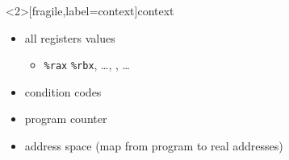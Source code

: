 
\begin{frame}<2>[fragile,label=context]{context}
\begin{itemize}
\item all registers values
    \begin{itemize}
        \item \lstinline|%rax| \lstinline|%rbx|, \ldots, , \ldots
    \end{itemize}
\item condition codes
\item program counter
\item address space (map from program to real addresses)
\end{itemize}
\end{frame}

